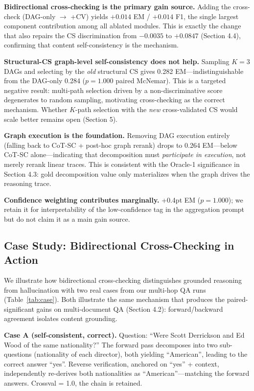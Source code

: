 \documentclass[11pt,a4paper]{article}
\begin{document}
\textbf{Bidirectional cross-checking is the primary gain source.} Adding the cross-check (DAG-only $\to$ +CV) yields $+0.014$ EM / $+0.014$ F1, the single largest component contribution among all ablated modules. This is exactly the change that also repairs the CS discrimination from $-0.0035$ to $+0.0847$ (Section 4.4), confirming that content self-consistency is the mechanism.

\textbf{Structural-CS graph-level self-consistency does not help.} Sampling $K=3$ DAGs and selecting by the \emph{old} structural CS gives 0.282 EM---indistinguishable from the DAG-only 0.284 ($p=1.000$ paired McNemar). This is a targeted negative result: multi-path selection driven by a non-discriminative score degenerates to random sampling, motivating cross-checking as the correct mechanism. Whether $K$-path selection with the \emph{new} cross-validated CS would scale better remains open (Section 5).

\textbf{Graph execution is the foundation.} Removing DAG execution entirely (falling back to CoT-SC + post-hoc graph rerank) drops to 0.264 EM---below CoT-SC alone---indicating that decomposition must \emph{participate in execution}, not merely rerank linear traces. This is consistent with the Oracle-1 significance in Section 4.3: gold decomposition value only materializes when the graph drives the reasoning trace.

\textbf{Confidence weighting contributes marginally.} +0.4pt EM ($p=1.000$); we retain it for interpretability of the low-confidence tag in the aggregation prompt but do not claim it as a main gain source.

\subsection{Case Study: Bidirectional Cross-Checking in Action}

We illustrate how bidirectional cross-checking distinguishes grounded reasoning from hallucination with two real cases from our multi-hop QA runs (Table~\ref{tab:case}). Both illustrate the same mechanism that produces the paired-significant gains on multi-document QA (Section 4.2): forward/backward agreement isolates content grounding.

\textbf{Case A (self-consistent, correct).} Question: ``Were Scott Derrickson and Ed Wood of the same nationality?'' The forward pass decomposes into two sub-questions (nationality of each director), both yielding ``American'', leading to the correct answer ``yes''. Reverse verification, anchored on ``yes'' + context, independently re-derives both nationalities as ``American''---matching the forward answers. Crossval = 1.0, the chain is retained.
\end{document}
